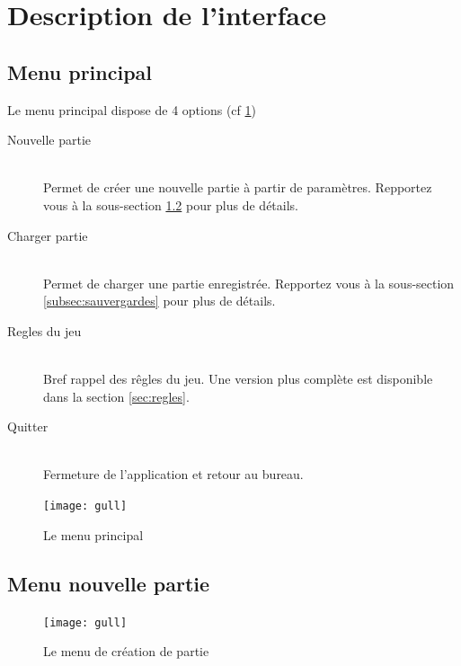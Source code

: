 ﻿\section{Description de l'interface}
	\subsection{Menu principal}
		Le menu principal dispose de 4 options (cf \ref{fig:menuPrinc})
		
		\begin{description}
			\item[Nouvelle partie] \hfill \\
				Permet de créer une nouvelle partie à partir de paramètres. Repportez vous à la sous-section \ref{subsec:nouvellpartie} pour plus de détails.
			\item[Charger partie] \hfill \\
				Permet de charger une partie enregistrée. Repportez vous à la sous-section \ref{subsec:sauvergardes} pour plus de détails.
			\item[Regles du jeu] \hfill \\
				Bref rappel des rêgles du jeu. Une version plus complète est disponible dans la section \ref{sec:regles}.
			\item[Quitter] \hfill \\
				Fermeture de l'application et retour au bureau.
		\end{description}
		
		\begin{figure}[h!]
			\caption{Le menu principal}
			\label{fig:menuPrinc}
			\centering
			\texttt{[image: gull]}
		\end{figure}
	
	\subsection{Menu nouvelle partie}
		\label{subsec:nouvellpartie}
		
		\begin{figure}[h!]
			\caption{Le menu de création de partie}
			\label{fig:menuCreat}
			\centering
			\texttt{[image: gull]}
		\end{figure}
		
